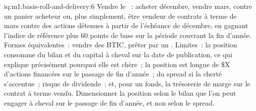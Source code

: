 \begin{solution}{iq:m1:basis-roll-and-delivery:6}
Vendre le ~: acheter décembre, vendre mars, contre un panier acheteur ou, plus simplement, être vendeur
de contrats à terme de mars contre des actions détenues à partir de l'échéance de décembre, en
gagnant l'indice de référence plus 60 points de base sur la période couvrant la fin d'année.
Formes équivalentes~: vendre des BTIC, prêter par un . Limites~: la position consomme
du bilan et du capital à cheval sur la date de publication, ce qui explique précisément pourquoi elle est
chère~; la position est longue de \$X d'actions financées sur le passage de fin d'année~;  du spread si la cherté s'accentue~; risque de dividende~; et, pour un fonds, la trésorerie de marge
sur le contrat à terme vendu. Dimensionner la position selon le bilan que l'on peut engager à cheval sur
le passage de fin d'année, et non selon le spread.
\end{solution}
